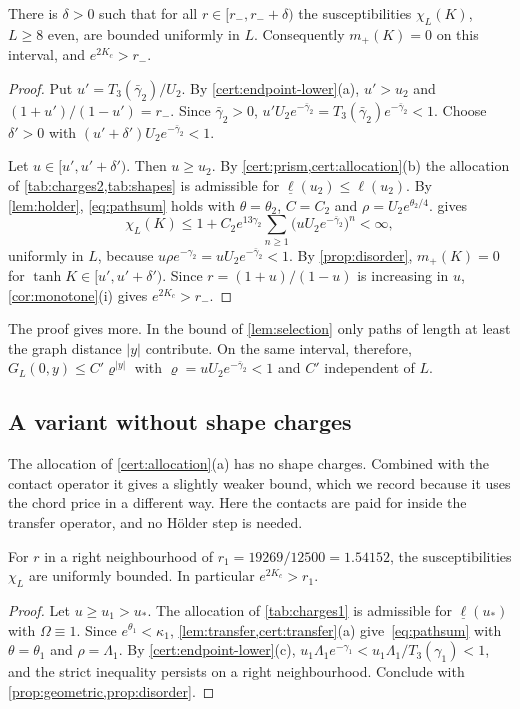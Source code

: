 \begin{theorem}\label{thm:lower}
There is $\delta>0$ such that for all $r\in[r_-,r_-+\delta)$ the susceptibilities $\chi_L(K)$, $L\ge8$ even, are bounded uniformly in $L$. Consequently $m_+(K)=0$ on this interval, and $e^{2K_c}>r_-$.
\end{theorem}

\begin{proof}
Put $u'=T_3(\bar\gamma_2)/U_2$. By \cref{cert:endpoint-lower}(a), $u'>u_2$ and $(1+u')/(1-u')=r_-$. Since $\bar\gamma_2>0$, $u'U_2e^{-\bar\gamma_2}=T_3(\bar\gamma_2)e^{-\bar\gamma_2}<1$. Choose $\delta'>0$ with $(u'+\delta')U_2e^{-\bar\gamma_2}<1$.

Let $u\in[u',u'+\delta')$. Then $u\ge u_2$. By \cref{cert:prism,cert:allocation}(b) the allocation of \cref{tab:charges2,tab:shapes} is admissible for $\underline\ell(u_2)\le\ell(u_2)$. By \cref{lem:holder}, \eqref{eq:pathsum} holds with $\theta=\theta_2$, $C=C_2$ and $\rho=U_2e^{\theta_2/4}$.  gives
\[
 \chi_L(K)\le1+C_2e^{13\gamma_2}\sum_{n\ge1}\bigl(uU_2e^{-\bar\gamma_2}\bigr)^n<\infty,
\]
uniformly in $L$, because $u\rho e^{-\gamma_2}=uU_2e^{-\bar\gamma_2}<1$. By \cref{prop:disorder}, $m_+(K)=0$ for $\tanh K\in[u',u'+\delta')$. Since $r=(1+u)/(1-u)$ is increasing in $u$, \cref{cor:monotone}(i) gives $e^{2K_c}>r_-$.
\end{proof}

\begin{remark}
The proof gives more. In the bound of \cref{lem:selection} only paths of length at least the graph distance $|y|$ contribute. On the same interval, therefore, $G_L(0,y)\le C'\varrho^{|y|}$ with $\varrho=uU_2e^{-\bar\gamma_2}<1$ and $C'$ independent of $L$.
\end{remark}

\subsection{A variant without shape charges}

The allocation of \cref{cert:allocation}(a) has no shape charges. Combined with the contact operator it gives a slightly weaker bound, which we record because it uses the chord price in a different way. Here the contacts are paid for inside the transfer operator, and no H\"older step is needed.

\begin{proposition}\label{prop:r1}
For $r$ in a right neighbourhood of $r_1=19269/12500=1.54152$, the susceptibilities $\chi_L$ are uniformly bounded. In particular $e^{2K_c}>r_1$.
\end{proposition}

\begin{proof}
Let $u\ge u_1>u_*$. The allocation of \cref{tab:charges1} is admissible for $\underline\ell(u_*)$ with $\Omega\equiv1$. Since $e^{\theta_1}<\kappa_1$, \cref{lem:transfer,cert:transfer}(a) give~\eqref{eq:pathsum} with $\theta=\theta_1$ and $\rho=\Lambda_1$. By \cref{cert:endpoint-lower}(c), $u_1\Lambda_1e^{-\gamma_1}<u_1\Lambda_1/T_3(\gamma_1)<1$, and the strict inequality persists on a right neighbourhood. Conclude with \cref{prop:geometric,prop:disorder}.
\end{proof}
